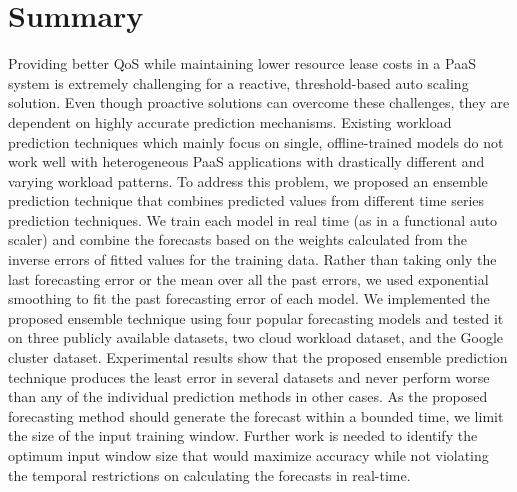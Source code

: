 \FloatBarrier
\section{Summary}

Providing better QoS while maintaining lower resource lease costs in a PaaS system is extremely challenging for a reactive, threshold-based auto scaling solution. Even though proactive solutions can overcome these challenges, they are dependent on highly accurate prediction mechanisms. Existing workload prediction techniques which mainly focus on single, offline-trained models do not work well with heterogeneous PaaS applications with drastically different and varying workload patterns. To address this problem, we proposed an ensemble prediction technique that combines predicted values from different time series prediction techniques. We train each model in real time (as in a functional auto scaler) and combine the forecasts based on the weights calculated from the inverse errors of fitted values for the training data. Rather than taking only the last forecasting error or the mean over all the past errors, we used exponential smoothing to fit the past forecasting error of each model. We implemented the proposed ensemble technique using four popular forecasting models and tested it on three publicly available datasets, two cloud workload dataset, and the Google cluster dataset. Experimental results show that the proposed ensemble prediction technique produces the least error in several datasets and never perform worse than any of the individual prediction methods in other cases. As the proposed forecasting method should generate the forecast within a bounded time, we limit the size of the input training window. Further work is needed to identify the optimum input window size that would maximize accuracy while not violating the temporal restrictions on calculating the forecasts in real-time.